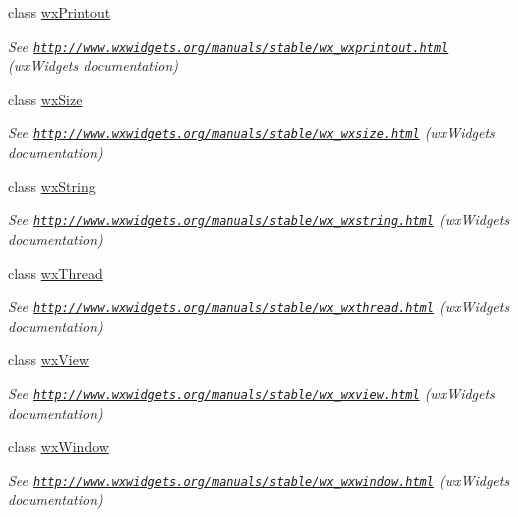 \begin{DoxyCompactItemize}
class \hyperlink{classwxPrintout}{wxPrintout}
\begin{DoxyCompactList}\small\item\em See \href{http://www.wxwidgets.org/manuals/stable/wx_wxprintout.html}{\tt http://www.wxwidgets.org/manuals/stable/wx\_\-wxprintout.html} (wxWidgets documentation) \item\end{DoxyCompactList}\item 
class \hyperlink{classwxSize}{wxSize}
\begin{DoxyCompactList}\small\item\em See \href{http://www.wxwidgets.org/manuals/stable/wx_wxsize.html}{\tt http://www.wxwidgets.org/manuals/stable/wx\_\-wxsize.html} (wxWidgets documentation) \item\end{DoxyCompactList}\item 
class \hyperlink{classwxString}{wxString}
\begin{DoxyCompactList}\small\item\em See \href{http://www.wxwidgets.org/manuals/stable/wx_wxstring.html}{\tt http://www.wxwidgets.org/manuals/stable/wx\_\-wxstring.html} (wxWidgets documentation) \item\end{DoxyCompactList}\item 
class \hyperlink{classwxThread}{wxThread}
\begin{DoxyCompactList}\small\item\em See \href{http://www.wxwidgets.org/manuals/stable/wx_wxthread.html}{\tt http://www.wxwidgets.org/manuals/stable/wx\_\-wxthread.html} (wxWidgets documentation) \item\end{DoxyCompactList}\item 
class \hyperlink{classwxView}{wxView}
\begin{DoxyCompactList}\small\item\em See \href{http://www.wxwidgets.org/manuals/stable/wx_wxview.html}{\tt http://www.wxwidgets.org/manuals/stable/wx\_\-wxview.html} (wxWidgets documentation) \item\end{DoxyCompactList}\item 
class \hyperlink{classwxWindow}{wxWindow}
\begin{DoxyCompactList}\small\item\em See \href{http://www.wxwidgets.org/manuals/stable/wx_wxwindow.html}{\tt http://www.wxwidgets.org/manuals/stable/wx\_\-wxwindow.html} (wxWidgets documentation) \item\end{DoxyCompactList}\end{DoxyCompactItemize}

